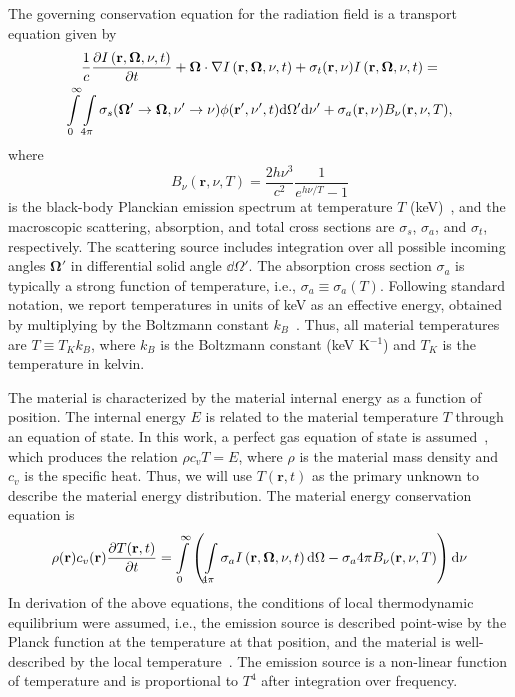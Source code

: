 The governing conservation equation for the radiation field is a transport equation given
by~\cite{mihalas,lewis,wollaber_thesis}
 \begin{multline}
     \frac{1}{c} \frac{\partial I\left(\mathbf{r},\mathbf{\Omega},\nu,t\right)}{\partial t} + \mathbf{\Omega}\cdot \nabla I \left(\mathbf{r},\mathbf{\Omega},\nu,t\right) + \sigma_t
     (\mathbf{r},\nu) I \left(\mathbf{r},\mathbf{\Omega},\nu,t\right) = \\ \int \limits_0^\infty \int \limits_{4\pi}
     \sigma_s(\mathbf{\Omega'} \rightarrow \mathbf{\Omega},\nu'\rightarrow\nu)
     \phi(\mathbf{r}',\nu',t) \mathrm{d} \Omega' \mathrm{d} \nu' +
     \sigma_a(\mathbf{r},\nu)B_\nu(\mathbf{r},\nu,T),
 \end{multline}
where
\begin{equation}
    B_\nu(\mathbf{r},\nu,T) = \frac{2 h \nu^3}{c^2} \frac{1}{e^{h\nu/T} - 1}
\end{equation}
is the black-body Planckian emission
spectrum at temperature $T$ (keV)~\cite{mihalas}, and the macroscopic scattering, absorption, and total cross sections are $\sigma_s$,
$\sigma_a$, and $\sigma_t$, respectively. 
 The scattering source includes
integration over all possible incoming angles $\mathbf\Omega'$ in differential
solid angle $\dd \Omega'$.  The absorption cross section $\sigma_a$ is typically
a strong function of temperature, i.e., $\sigma_a\equiv \sigma_a(T)$.  Following standard notation, we
report temperatures in units of keV as an effective energy, obtained by multiplying by the Boltzmann
constant $k_B$~\cite{mihalas}.  Thus, all material temperatures are $T \equiv T_{K}
k_B$, where $k_B$ is the Boltzmann constant (keV K$^{-1}$) and $T_{K}$ is the temperature
in kelvin.

The material is characterized by the material internal
energy as a function of position.  The internal energy $E$ is related to the material
temperature $T$ through an equation of state.   In this work, a perfect gas equation of state is
assumed~\cite{toro}, which produces the relation $\rho c_v T = E$, where $\rho$ is the
material mass density and $c_v$ is the specific heat.  Thus, we will use $T(\mathbf{r},t)$ as the
primary unknown to describe the material energy distribution.  The material energy conservation equation is
\begin{equation}
    \rho(\mathbf{r}) c_v(\mathbf{r}) \frac{\partial T(\mathbf{r},t)}{\partial t} = \int\limits_0^\infty
    \left( \int\limits_{4\pi} \sigma_a I \left(\mathbf{r},\mathbf{\Omega},\nu,t\right) \mathrm{d} \Omega - \sigma_a 4\pi B_\nu(\mathbf{r},\nu,T) \right) \mathrm{d} \nu
 \end{equation}
 In derivation of the above equations, the conditions of local thermodynamic equilibrium
were assumed, i.e., the emission source is described point-wise by the
Planck function at the temperature at that position, and the material is well-described by
the local temperature~\cite{mihalas,wollaber_thesis}. The emission source is a non-linear function of temperature and is
proportional to $T^4$ after integration over frequency.  

